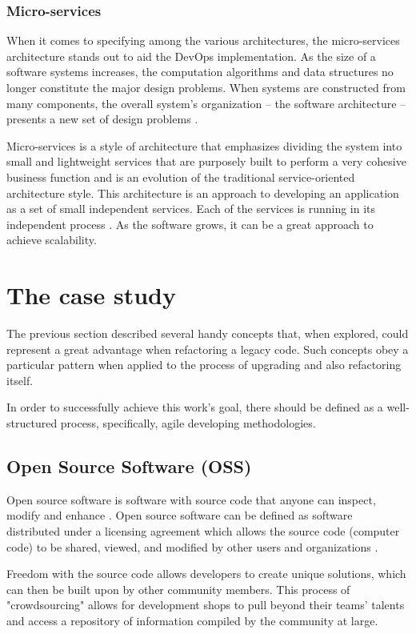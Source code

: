 \subsubsection{Micro-services}

When it comes to specifying among the various architectures, the micro-services
architecture stands out to aid the DevOps implementation. As the size of a
software systems increases, the computation algorithms and data structures no
longer constitute the major design problems. When systems are constructed from
many components, the overall system's organization – the software architecture –
presents a new set of design problems \cite{show1993}.

Micro-services is a style of architecture that emphasizes dividing the system
into small and lightweight services that are purposely built to perform a very
cohesive business function and is an evolution of the traditional
service-oriented architecture style. This architecture is an approach to
developing an application as a set of small independent services. Each of the
services is running in its independent process \cite{namiot2014}. As the
software grows, it can be a great approach to achieve scalability.

\section{The case study}

The previous section described several handy concepts that, when explored, could
represent a great advantage when refactoring a legacy code. Such concepts obey a
particular pattern when applied to the process of upgrading and also refactoring
itself.

In order to successfully achieve this work's goal, there should be defined as a
well-structured process, specifically, agile developing methodologies.

\subsection{Open Source Software (OSS)}

Open source software is software with source code that anyone can inspect,
modify and enhance \cite{oss2019}. Open source software can be defined as
software distributed under a licensing agreement which allows the source code
(computer code) to be shared, viewed, and modified by other users and
organizations \cite{bansal2015}.

Freedom with the source code allows developers to create unique solutions, which
can then be built upon by other community members. This process of
"crowdsourcing" allows for development shops to pull beyond their teams' talents
and access a repository of information compiled by the community at large.

